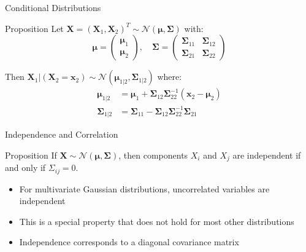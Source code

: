 \documentclass{beamer}
\begin{document}
\begin{frame}{Conditional Distributions}
  \begin{block}{Proposition}
    Let $\mathbf{X} = (\mathbf{X}_1, \mathbf{X}_2)^T \sim \mathcal{N}(\boldsymbol{\mu}, \boldsymbol{\Sigma})$ with:
    \[
    \boldsymbol{\mu} = \begin{pmatrix} \boldsymbol{\mu}_1 \\ \boldsymbol{\mu}_2 \end{pmatrix}, \quad
    \boldsymbol{\Sigma} = \begin{pmatrix} \boldsymbol{\Sigma}_{11} & \boldsymbol{\Sigma}_{12} \\ \boldsymbol{\Sigma}_{21} & \boldsymbol{\Sigma}_{22} \end{pmatrix}
    \]
    
    Then $\mathbf{X}_1 | (\mathbf{X}_2 = \mathbf{x}_2) \sim \mathcal{N}(\boldsymbol{\mu}_{1|2}, \boldsymbol{\Sigma}_{1|2})$ where:
    \begin{align*}
    \boldsymbol{\mu}_{1|2} &= \boldsymbol{\mu}_1 + \boldsymbol{\Sigma}_{12}\boldsymbol{\Sigma}_{22}^{-1}(\mathbf{x}_2 - \boldsymbol{\mu}_2) \\
    \boldsymbol{\Sigma}_{1|2} &= \boldsymbol{\Sigma}_{11} - \boldsymbol{\Sigma}_{12}\boldsymbol{\Sigma}_{22}^{-1}\boldsymbol{\Sigma}_{21}
    \end{align*}
  \end{block}
\end{frame}

\begin{frame}{Independence and Correlation}
  \begin{block}{Proposition}
    If $\mathbf{X} \sim \mathcal{N}(\boldsymbol{\mu}, \boldsymbol{\Sigma})$, then components $X_i$ and $X_j$ are independent if and only if $\Sigma_{ij} = 0$.
  \end{block}
  
  \begin{itemize}
    \item For multivariate Gaussian distributions, uncorrelated variables are independent
    \item This is a special property that does not hold for most other distributions
    \item Independence corresponds to a diagonal covariance matrix
  \end{itemize}
\end{frame}

\end{document}
